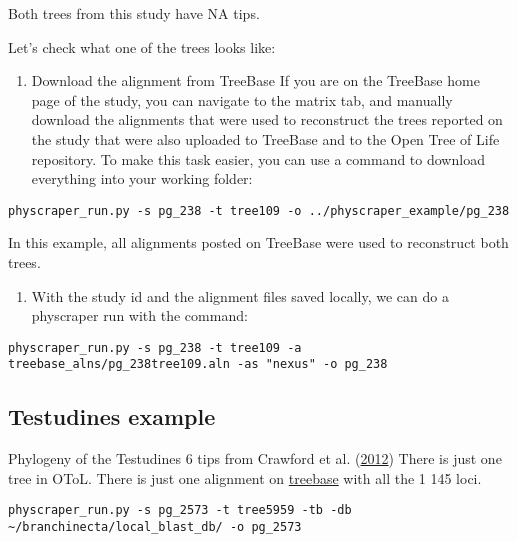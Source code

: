 \documentclass[]{article}
\providecommand{\tightlist}{%
  \setlength{\itemsep}{0pt}\setlength{\parskip}{0pt}}
\begin{document}
Both trees from this study have NA tips.

Let's check what one of the trees looks like:

\begin{enumerate}
\def\labelenumi{\arabic{enumi}.}
\tightlist
\item
  Download the alignment from TreeBase
  If you are on the TreeBase home page of the study, you can navigate to the matrix tab, and manually download the alignments that were used to reconstruct the trees reported on the study that were also uploaded to TreeBase and to the Open Tree of Life repository.
  To make this task easier, you can use a command to download everything into your working folder:
\end{enumerate}

\begin{verbatim}
physcraper_run.py -s pg_238 -t tree109 -o ../physcraper_example/pg_238
\end{verbatim}

In this example, all alignments posted on TreeBase were used to reconstruct both trees.

\begin{enumerate}
\def\labelenumi{\arabic{enumi}.}
\tightlist
\item
  With the study id and the alignment files saved locally, we can do a physcraper run with the command:
\end{enumerate}

\begin{verbatim}
physcraper_run.py -s pg_238 -t tree109 -a treebase_alns/pg_238tree109.aln -as "nexus" -o pg_238
\end{verbatim}

\hypertarget{testudines-example}{%
\subsection{Testudines example}\label{testudines-example}}

Phylogeny of the Testudines 6 tips from Crawford et al. (\protect\hyperlink{ref-crawford2012more}{2012})
There is just one tree in OToL.
There is just one alignment on \href{https://treebase.org/treebase-web/search/study/matrices.html?id=12742}{treebase} with all the 1 145 loci.

\begin{verbatim}
physcraper_run.py -s pg_2573 -t tree5959 -tb -db ~/branchinecta/local_blast_db/ -o pg_2573
\end{verbatim}
\end{document}
